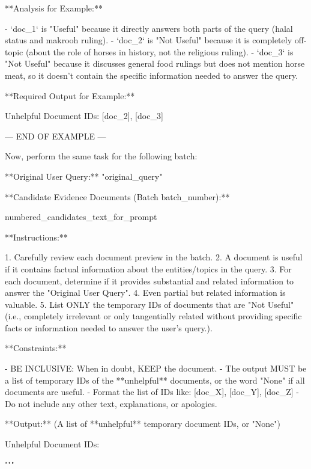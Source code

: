 \documentclass[11pt]{article}
\begin{document}
\begin{PromptBlock}

**Analysis for Example:**

- `doc_1` is "Useful" because it directly answers both parts of the query (halal status and makrooh ruling).
- `doc_2` is "Not Useful" because it is completely off-topic (about the role of horses in history, not the religious ruling).
- `doc_3` is "Not Useful" because it discusses general food rulings but does not mention horse meat, so it doesn't contain the specific information needed to answer the query.

**Required Output for Example:**

Unhelpful Document IDs: [doc_2], [doc_3]

--- END OF EXAMPLE ---

Now, perform the same task for the following batch:

**Original User Query:** "{original_query}"

**Candidate Evidence Documents (Batch {batch_number}):**

{numbered_candidates_text_for_prompt}

**Instructions:**

1. Carefully review each document preview in the batch.
2. A document is useful if it contains factual information about the entities/topics in the query.
3. For each document, determine if it provides substantial and related information to answer the "Original User Query".
4. Even partial but related information is valuable.
5. List ONLY the temporary IDs of documents that are "Not Useful" (i.e., completely irrelevant or only tangentially related without providing specific facts or information needed to answer the user's query.).

**Constraints:**

- BE INCLUSIVE: When in doubt, KEEP the document.
- The output MUST be a list of temporary IDs of the **unhelpful** documents, or the word "None" if all documents are useful.
- Format the list of IDs like: [doc_X], [doc_Y], [doc_Z]
- Do not include any other text, explanations, or apologies.

**Output:** (A list of **unhelpful** temporary document IDs, or "None")

Unhelpful Document IDs:

"""
\end{PromptBlock}
\end{document}

